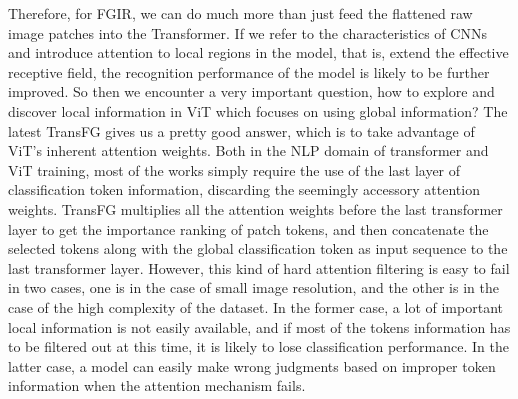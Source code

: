 \documentclass[sigconf]{acmart}
\begin{document}
Therefore, for FGIR, we can do much more than just feed the flattened raw image patches into the Transformer. If we refer to the characteristics of CNNs and introduce attention to local regions in the model, that is, extend the effective receptive field, the recognition performance of the model is likely to be further improved. So then we encounter a very important question, how to explore and discover local information in ViT which focuses on using global information?  The latest TransFG \cite{TransFG} gives us a pretty good answer, which is to take advantage of ViT's inherent attention weights. Both in the NLP domain of transformer and ViT training, most of the works simply require the use of the last layer of classification token information, discarding the seemingly accessory attention weights. TransFG multiplies all the attention weights before the last transformer layer to get the importance ranking of patch tokens, and then concatenate the selected tokens along with the global classification token as input sequence to the last transformer layer. However, this kind of hard attention filtering is easy to fail in two cases, one is in the case of small image resolution, and the other is in the case of the high complexity of the dataset. In the former case, a lot of important local information is not easily available, and if most of the tokens information has to be filtered out at this time, it is likely to lose classification performance. In the latter case, a model can easily make wrong judgments based on improper token information when the attention mechanism fails.
\end{document}
